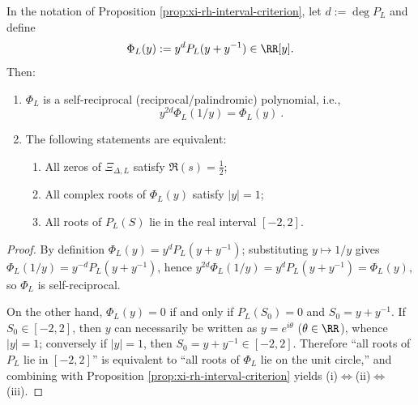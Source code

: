\begin{corollary}\label{cor:xi-rh-unit-circle-reciprocal}
In the notation of Proposition \ref{prop:xi-rh-interval-criterion}, let \(d:=\deg P_L\) and define
\[
\Phi_L(y):=y^{d}P_L(y+y^{-1})\in\RR[y].
\]
Then:
\begin{enumerate}
  \item \(\Phi_L\) is a self-reciprocal (reciprocal/palindromic) polynomial, i.e.,
  \[
  \boxed{\ y^{2d}\Phi_L(1/y)=\Phi_L(y)\ }.
  \]
  \item The following statements are equivalent:
  \begin{enumerate}
    \item[(i)] All zeros of \(\Xi_{\Delta,L}\) satisfy \(\Re(s)=\tfrac12\);
    \item[(ii)] All complex roots of \(\Phi_L(y)\) satisfy \(|y|=1\);
    \item[(iii)] All roots of \(P_L(S)\) lie in the real interval \([-2,2]\).
  \end{enumerate}
\end{enumerate}
\end{corollary}
\begin{proof}
By definition \(\Phi_L(y)=y^{d}P_L(y+y^{-1})\); substituting \(y\mapsto 1/y\) gives
\(
\Phi_L(1/y)=y^{-d}P_L(y+y^{-1})
\),
hence \(y^{2d}\Phi_L(1/y)=y^{d}P_L(y+y^{-1})=\Phi_L(y)\), so \(\Phi_L\) is self-reciprocal.
\par
On the other hand, \(\Phi_L(y)=0\) if and only if \(P_L(S_0)=0\) and \(S_0=y+y^{-1}\).
If \(S_0\in[-2,2]\), then \(y\) can necessarily be written as \(y=e^{i\theta}\) (\(\theta\in\RR\)), whence \(|y|=1\); conversely if \(|y|=1\), then \(S_0=y+y^{-1}\in[-2,2]\).
Therefore ``all roots of \(P_L\) lie in \([-2,2]\)'' is equivalent to ``all roots of \(\Phi_L\) lie on the unit circle,'' and combining with Proposition \ref{prop:xi-rh-interval-criterion} yields (i)\(\Leftrightarrow\)(ii)\(\Leftrightarrow\)(iii).
\end{proof}

